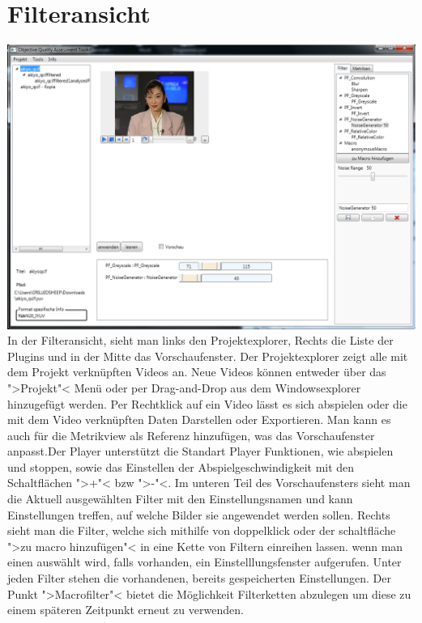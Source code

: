 \chapter{Filteransicht}
\includegraphics[scale=0.55]{bilder/Filter.png}\\[5ex]
In der Filteransicht, sieht man links den Projektexplorer, Rechts die Liste der Plugins und in der Mitte das Vorschaufenster.
Der Projektexplorer zeigt alle mit dem Projekt verknüpften Videos an. Neue Videos können entweder über das ">Projekt"< Menü oder per Drag-and-Drop aus dem Windowsexplorer hinzugefügt werden.
Per Rechtklick auf ein Video lässt es sich abspielen oder die mit dem Video verknüpften Daten Darstellen oder Exportieren. Man kann es auch für die Metrikview als Referenz hinzufügen, was das Vorschaufenster anpasst.Der Player unterstützt die Standart Player Funktionen, wie abspielen und stoppen, sowie das Einstellen der Abspielgeschwindigkeit mit den Schaltflächen ">+"< bzw ">-"<. Im unteren Teil des Vorschaufensters sieht man die Aktuell ausgewählten Filter mit den Einstellungsnamen und kann Einstellungen treffen, auf welche Bilder sie angewendet werden sollen. Rechts sieht man die Filter, welche sich mithilfe von doppelklick oder der schaltfläche ">zu macro hinzufügen"< in eine Kette von Filtern einreihen lassen. wenn man einen auswählt wird, falls vorhanden, ein Einstelllungsfenster aufgerufen. Unter jeden Filter stehen die vorhandenen, bereits gespeicherten Einstellungen. Der Punkt ">Macrofilter"< bietet die Möglichkeit Filterketten abzulegen um diese zu einem späteren Zeitpunkt erneut zu verwenden.


